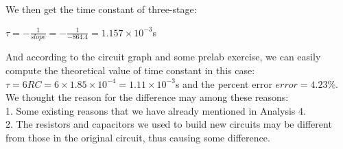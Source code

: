 \phantom{ }We then get the time constant of three-stage: 
\begin{center}
	$\tau = -\frac{1}{slope} = -\frac{1}{-864.4} = 1.157\times10^{-3}$s
\end{center}

And according to the circuit graph and some prelab exercise, we can easily compute
the theoretical value of time constant in this case:
$\tau = 6RC = 6\times1.85\times10^{-4} = 1.11\times10^{-3}$s and the percent error $error = 4.23\%$.\\
\phantom{ } We thought the reason for the difference may among these reasons:\\
1. Some existing reasons that we have already mentioned in Analysis 4.\\
2. The resistors and capacitors we used to build new circuits may be different from those in the original circuit, thus causing some difference.\\


